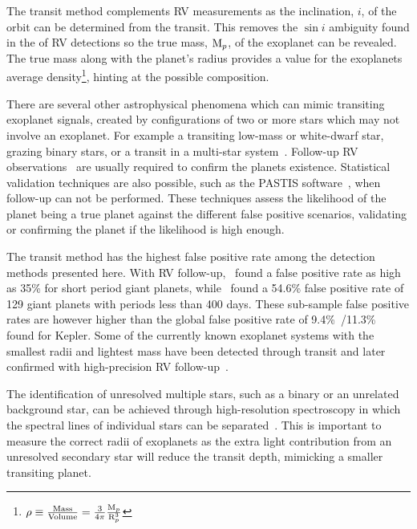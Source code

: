 The transit method complements {RV} measurements as the inclination, $i$, of the orbit can be determined from the transit.
This removes the {$\sin{i}$} ambiguity found in the \Mpsini{} of {RV} detections so the true mass, $\textrm{M}_{p}$, of the exoplanet can be revealed.
The true mass along with the planet's radius provides a value for the exoplanets average density\footnote{$\rho \equiv \frac{\textrm{Mass}}{\textrm{Volume}} = \frac{3}{4\pi}\frac{\textrm{M}_{p}}{\textrm{R}_{p}^{3}}$}, hinting at the possible composition.

There are several other astrophysical phenomena which can mimic transiting exoplanet signals, created by configurations of two or more stars which may not involve an exoplanet.
For example a transiting low-mass or white-dwarf star, grazing binary stars, or a transit in a multi-star system~\citep[see e.g.][]{cameron_extrasolar_2012, santerne_contribution_2013}.
Follow-up {RV} observations~\citep[e.g.][]{santerne_radial_2011} are usually required to confirm the planets existence.
Statistical validation techniques are also possible, such as the PASTIS software~\citep{diaz_pastis_2014}, when follow-up can not be performed.
These techniques assess the likelihood of the planet being a true planet against the different false positive scenarios, validating or confirming the planet if the likelihood is high enough.

The transit method has the highest false positive rate among the detection methods presented here.
With {RV} follow-up,~\citet{santerne_sophie_2012} found a false positive rate as high as 35\% for short period giant planets, while~\citet{santerne_sophie_2016} found a 54.6\% false positive rate of 129 giant planets with periods less than 400 days.
These sub-sample false positive rates are however higher than the global false positive rate of 9.4\%~\citep{fressin_false_2013}/11.3\%~\citep{santerne_contribution_2013} found for Kepler.
Some of the currently known exoplanet systems with the smallest radii and lightest mass have been detected through transit and later confirmed with high-precision {RV} follow-up~\citep[e.g.][]{queloz_corot7_2009, pepe_earthsized_2013, lopez-morales_kepler21b_2016, ment_second_2018}.

The identification of unresolved multiple stars, such as a binary or an unrelated background star, can be achieved through high-resolution spectroscopy in which the spectral lines of individual stars can be separated~\citep{kolbl_detection_2015}.
This is important to measure the correct radii of exoplanets as the extra light contribution from an unresolved secondary star will reduce the transit depth, mimicking a smaller transiting planet.

